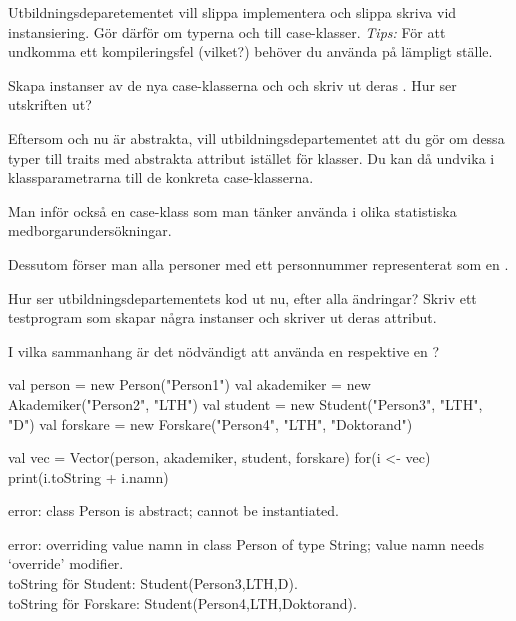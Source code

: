 \Subtask Utbildningsdeparetementet vill slippa implementera  och slippa skriva  vid instansiering. Gör därför om typerna  och  till case-klasser. \emph{Tips:} För att undkomma ett kompileringsfel (vilket?) behöver du använda  på lämpligt ställe.

Skapa instanser av de nya case-klasserna  och  och skriv ut deras . Hur ser utskriften ut?

\Subtask Eftersom  och  nu är abstrakta, vill utbildningsdepartementet att du gör om dessa typer till traits med abstrakta attribut istället för klasser. Du kan då undvika  i klassparametrarna till de konkreta case-klasserna.

Man inför också en case-klass  som man tänker använda i olika statistiska medborgarundersökningar.

Dessutom förser man alla personer med ett personnummer representerat som en .

Hur ser utbildningsdepartementets kod ut nu, efter alla ändringar? Skriv ett testprogram som skapar några instanser och skriver ut deras attribut.

\Subtask I vilka sammanhang är det nödvändigt att använda en  respektive en ?

\SOLUTION


\TaskSolved \what


\SubtaskSolved
\begin{Code}
val person = new Person("Person1")
val akademiker = new Akademiker("Person2", "LTH")
val student = new Student("Person3", "LTH", "D")
val forskare = new Forskare("Person4", "LTH", "Doktorand")
\end{Code}

\SubtaskSolved
\begin{Code}
val vec = Vector(person, akademiker, student, forskare)
for(i <- vec){ print(i.toString + i.namn) }
\end{Code}

\SubtaskSolved  error: class Person is abstract; cannot be instantiated.

\SubtaskSolved  error: overriding value namn in class Person of type String; value namn needs `override' modifier.\\
toString för Student: Student(Person3,LTH,D). \\
toString för Forskare: Student(Person4,LTH,Doktorand).

